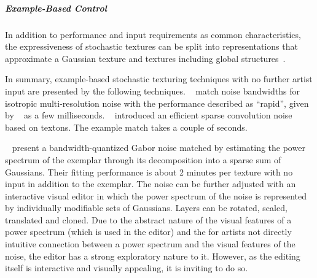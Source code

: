 \subparagraph{Example-Based Control}
\label{subpara:analysis_stochastic_examplebased_control}



In addition to performance and input requirements as common characteristics, the expressiveness of stochastic textures can be split into representations that approximate a Gaussian texture and textures including global structures~\cite{galerne_2017_tno,lagae_2010_sap}.

In summary, example-based stochastic texturing techniques with no further artist input are presented by the following techniques. \citeauthor*{lagae_2010_pis}~\cite{lagae_2010_pis} match noise bandwidths for isotropic multi-resolution noise with the performance described as ``rapid'', given by \citeauthor*{gilet_2012_mkn}~\cite{gilet_2012_mkn} as a few milliseconds. \citeauthor*{galerne_2017_tno}~\cite{galerne_2017_tno} introduced an efficient sparse convolution noise based on textons. The example match takes a couple of seconds.

\citeauthor*{galerne_2012_gne}~\cite{galerne_2012_gne} present a bandwidth-quantized Gabor noise matched by estimating the power spectrum of the exemplar through its decomposition into a sparse sum of Gaussians. Their fitting performance is about 2 minutes per texture with no input in addition to the exemplar. The noise can be further adjusted with an interactive visual editor in which the power spectrum of the noise is represented by individually modifiable sets of Gaussians. Layers can be rotated, scaled, translated and cloned. Due to the abstract nature of the visual features of a power spectrum (which is used in the editor) and the for artists not directly intuitive connection between a power spectrum and the visual features of the noise, the editor has a strong exploratory nature to it. However, as the editing itself is interactive and visually appealing, it is inviting to do so. 

